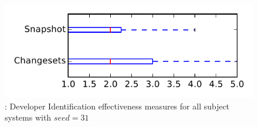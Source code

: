 
\begin{figure}
\centering
\includegraphics[height=0.4\textheight]{figures/dit_seed/rq1_tiny_31}
\caption{\rtwo: Developer Identification effectiveness measures for all subject systems with $seed=31$}
\label{fig:dit_seed:rq1:tiny}
\end{figure}
